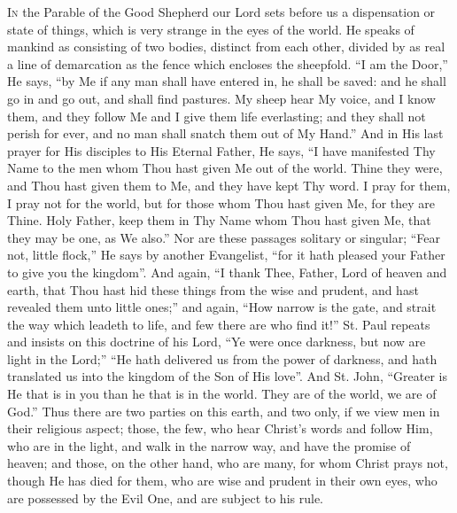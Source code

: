 I\textsc{n} the Parable of the Good Shepherd our Lord sets before us a
dispensation or state of things, which is very strange in the eyes of
the world. He speaks of mankind as consisting of two bodies, distinct
from each other, divided by as real a line of demarcation as the fence
which encloses the sheepfold. ``I am the Door,'' He says,
``by Me if any man shall have entered in, he shall be saved: and
he shall go in and go out, and shall find pastures. My sheep hear My
voice, and I know them, and they follow Me and I give them life
everlasting; and they shall not perish for ever, and no man shall
snatch them out of My Hand.'' And in His last prayer for His
disciples to His Eternal Father, He says, ``I have manifested Thy
Name to the men whom Thou hast given Me out of the world. Thine they
were, and Thou hast given them to Me, and they have kept Thy word. I
pray for them, I pray not for the world, but for those whom Thou hast
given Me, for they are Thine. Holy Father, keep them in Thy Name whom
Thou hast given Me, that they may be one, as We also.'' Nor are
these passages solitary or singular; ``Fear not, little
flock,'' He says by another Evangelist, ``for it hath pleased
your Father to give you the kingdom''. And again, ``I thank
Thee, Father, Lord of heaven and earth, that Thou hast hid these
things from the wise and prudent, and hast revealed them unto little
ones;'' and again, ``How narrow is the gate, and strait the
way which leadeth to life, and few there are who find it!'' St.
Paul repeats and insists on this doctrine of his Lord, ``Ye were
once darkness, but now are light in the Lord;'' ``He hath
delivered us from the power of darkness, and hath translated us into
the kingdom of the Son of His love''. And St. John, ``Greater
is He that is in you than he that is in the world. They are of the
world, we are of God.'' Thus there are two parties on this earth,
and two only, if we view men in their religious aspect; those, the
few, who hear Christ's words and follow Him, who are in the light, and
walk in the narrow way, and have the promise of heaven; and those, on
the other hand, who are many, for whom Christ prays not, though He has
died for them, who are wise and prudent in their own eyes, who are
possessed by the Evil One, and are subject to his rule.

